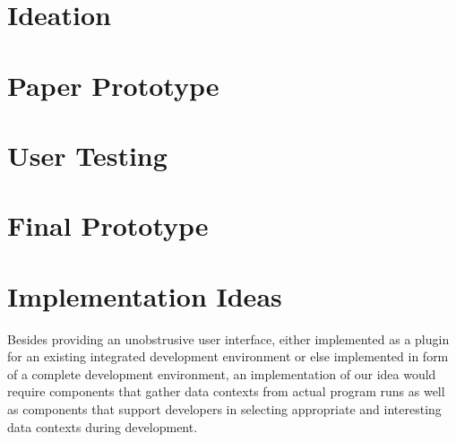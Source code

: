 \documentclass[runningheads]{llncs}
\begin{document}
\section{Ideation} \label{sec:IDEATION}

\section{Paper Prototype} \label{sec:PAPER_PROTOTYPE}

\section{User Testing} \label{sec:USER_TESTING}

\section{Final Prototype} \label{sec:FINAL_PROTOTYPE}

\section{Implementation Ideas} \label{sec:IMPLEMENTATION_IDEAS}
Besides providing an unobstrusive user interface, either implemented as a plugin for an existing integrated development environment or else implemented in form of a complete development environment, an implementation of our idea would require components that gather data contexts from actual program runs as well as components that support developers in selecting appropriate and interesting data contexts during development.

\end{document}
